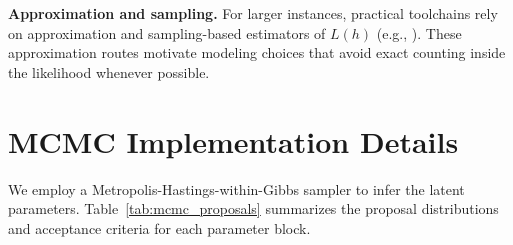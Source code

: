 \documentclass{article}
\theoremstyle{plain}
\theoremstyle{definition}
\theoremstyle{remark}
\begin{document}
\noindent \textbf{Approximation and sampling.}
For larger instances, practical toolchains rely on approximation and sampling-based estimators of $L(h)$
(e.g., \cite{talvitie2024approximate}). These approximation routes motivate modeling choices
that avoid exact counting inside the likelihood whenever possible.
%



\section{MCMC Implementation Details}
\label{app:mcmc_details}

We employ a Metropolis-Hastings-within-Gibbs sampler to infer the latent parameters. Table~\ref{tab:mcmc_proposals} summarizes the proposal distributions and acceptance criteria for each parameter block.
\end{document}
